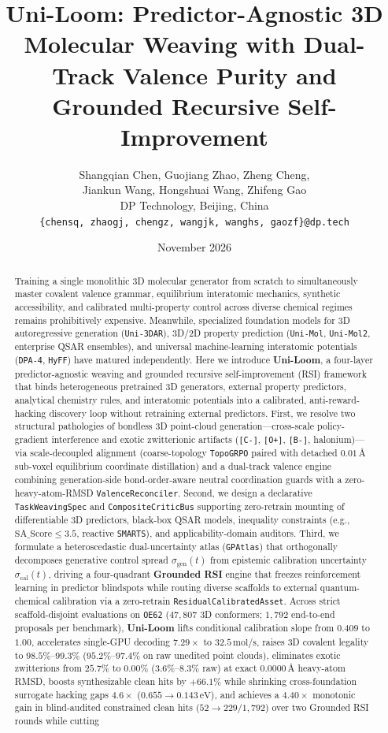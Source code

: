 \documentclass[11pt,a4paper]{article}
\title{\textbf{Uni-Loom: Predictor-Agnostic 3D Molecular Weaving with Dual-Track Valence Purity and Grounded Recursive Self-Improvement}}
\author{
Shangqian Chen, Guojiang Zhao, Zheng Cheng,\\
Jiankun Wang, Hongshuai Wang, Zhifeng Gao\\[4pt]
\small DP Technology, Beijing, China\\
\small\texttt{\{chensq, zhaogj, chengz, wangjk, wanghs, gaozf\}@dp.tech}
}
\date{November 2026}
\begin{document}
\maketitle

\begin{abstract}
Training a single monolithic 3D molecular generator from scratch to simultaneously master covalent valence grammar, equilibrium interatomic mechanics, synthetic accessibility, and calibrated multi-property control across diverse chemical regimes remains prohibitively expensive. Meanwhile, specialized foundation models for 3D autoregressive generation (\texttt{Uni-3DAR}), 3D/2D property prediction (\texttt{Uni-Mol}, \texttt{Uni-Mol2}, enterprise QSAR ensembles), and universal machine-learning interatomic potentials (\texttt{DPA-4}, \texttt{HyFF}) have matured independently. Here we introduce \textbf{Uni-Loom}, a four-layer predictor-agnostic weaving and grounded recursive self-improvement (RSI) framework that binds heterogeneous pretrained 3D generators, external property predictors, analytical chemistry rules, and interatomic potentials into a calibrated, anti-reward-hacking discovery loop without retraining external predictors. First, we resolve two structural pathologies of bondless 3D point-cloud generation---cross-scale policy-gradient interference and exotic zwitterionic artifacts (\texttt{[C-]}, \texttt{[O+]}, \texttt{[B-]}, halonium)---via scale-decoupled alignment (coarse-topology \texttt{TopoGRPO} paired with detached $0.01\,\text{\AA}$ sub-voxel equilibrium coordinate distillation) and a dual-track valence engine combining generation-side bond-order-aware neutral coordination guards with a zero-heavy-atom-RMSD \texttt{ValenceReconciler}. Second, we design a declarative \texttt{TaskWeavingSpec} and \texttt{CompositeCriticBus} supporting zero-retrain mounting of differentiable 3D predictors, black-box QSAR models, inequality constraints (e.g., $\text{SA\_Score} \le 3.5$, reactive \texttt{SMARTS}), and applicability-domain auditors. Third, we formulate a heteroscedastic dual-uncertainty atlas (\texttt{GPAtlas}) that orthogonally decomposes generative control spread $\sigma_{\text{gen}}(t)$ from epistemic calibration uncertainty $\sigma_{\text{cal}}(t)$, driving a four-quadrant \textbf{Grounded RSI} engine that freezes reinforcement learning in predictor blindspots while routing diverse scaffolds to external quantum-chemical calibration via a zero-retrain \texttt{ResidualCalibratedAsset}. Across strict scaffold-disjoint evaluations on \texttt{OE62} ($47{,}807$ 3D conformers; $1{,}792$ end-to-end proposals per benchmark), \textbf{Uni-Loom} lifts conditional calibration slope from $0.409$ to $1.00$, accelerates single-GPU decoding $7.29\times$ to $32.5\,\text{mol/s}$, raises 3D covalent legality to $98.5\%\text{--}99.3\%$ ($95.2\%\text{--}97.4\%$ on raw unedited point clouds), eliminates exotic zwitterions from $25.7\%$ to $0.00\%$ ($3.6\%\text{--}8.3\%$ raw) at exact $0.0000\,\text{\AA}$ heavy-atom RMSD, boosts synthesizable clean hits by $+66.1\%$ while shrinking cross-foundation surrogate hacking gaps $4.6\times$ ($0.655 \to 0.143\,\text{eV}$), and achieves a $4.40\times$ monotonic gain in blind-audited constrained clean hits ($52 \to 229 / 1{,}792$) over two Grounded RSI rounds while cutting 
\end{abstract}
\end{document}
